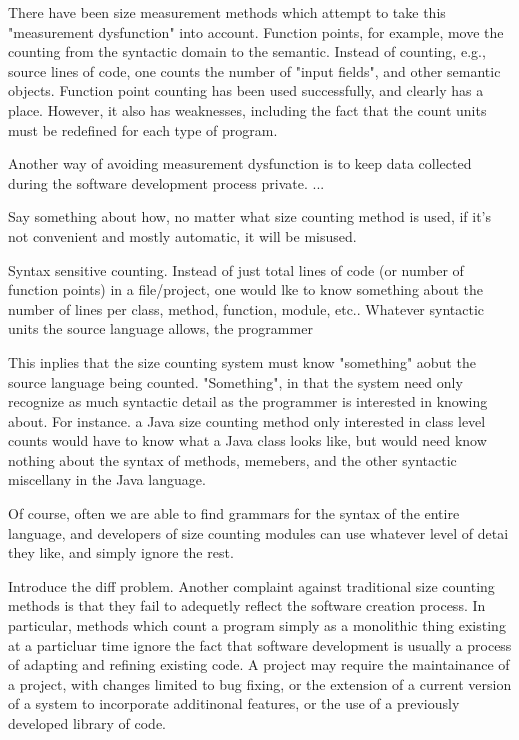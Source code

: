 \begin{introduction}
There have been size measurement methods which attempt to take this
"measurement dysfunction" into account.  Function points, for example, move
the counting from the syntactic domain to the semantic.  Instead of
counting, e.g., source lines of code, one counts the number of "input
fields", and other semantic objects.  Function point counting has been used
successfully, and clearly has a place.  However, it also has weaknesses,
including the fact that the count units must be redefined for each type of
program.

Another way of avoiding measurement dysfunction is to keep data collected
during the software development process private.  ...

Say something about how, no matter what size counting method is used, if
it's not convenient and mostly automatic, it will be misused.

Syntax sensitive counting.
Instead of just total lines of code (or number
of function points) in a file/project, one would lke to know something
about the number of lines per class, method, function, module, etc..
Whatever syntactic units the source language allows, the programmer

This inplies that the size counting system must know "something" aobut the
source language being counted.  "Something", in that the system need only
recognize as much syntactic detail as the programmer is interested in
knowing about.  For instance. a Java size counting method only interested
in class level counts would have to know what a Java class looks like, but
would need know nothing about the syntax of methods, memebers, and the
other syntactic miscellany in the Java language.

Of course, often we are able to find grammars for the syntax of the entire
language, and developers of size counting modules can use whatever level of
detai they like, and simply ignore the rest.

Introduce the diff problem.  
Another complaint against traditional size
counting methods is that they fail to adequetly reflect the software
creation process.  In particular, methods which count a program simply as a
monolithic thing existing at a particluar time ignore the fact that
software development is usually a process of adapting and refining existing
code.  A project may require the maintainance of a project, with changes
limited to bug fixing, or the extension of a current version of a system to
incorporate additinonal features, or the use of a previously developed
library of code.


\end{introduction}
